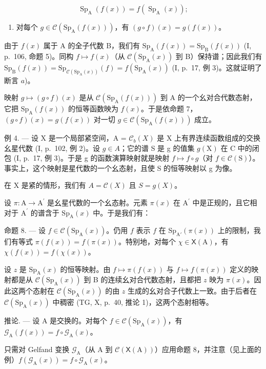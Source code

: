 \[
\operatorname{Sp} _ {\mathrm{A}} (f (x)) = f (\operatorname{Sp} _ {\mathrm{A}} (x));
\]

\begin{enumerate}
\def\labelenumi{\alph{enumi})}
\setcounter{enumi}{1}
\tightlist
\item
  对每个 \(g \in \mathcal{C}(\mathrm{Sp}_{\mathrm{A}}(f(x)))\)，有 \((g \circ f)(x) = g(f(x))\)。
\end{enumerate}

由于 \(f(x)\) 属于 A 的全子代数 B，我们有 \(\mathrm{Sp}_{\mathrm{A}}(f(x)) = \mathrm{Sp}_{\mathrm{B}}(f(x))\) (I, p.~106, 命题 5)。同构 \(f \mapsto f(x)\)（从 \(\mathcal{C}(\mathrm{Sp}_{\mathrm{A}}(x))\) 到 B）保持谱；因此我们有 \(\mathrm{Sp}_{\mathrm{B}}(f(x)) = \mathrm{Sp}_{\mathcal{C}(\mathrm{Sp}_{\mathrm{A}}(x))}(f) = f(\mathrm{Sp}_{\mathrm{A}}(x))\) (I, p.~17, 例 3)。这就证明了断言 \(a\))。

映射 \(g \mapsto (g \circ f)(x)\) 是从 \(\mathcal{C}(\mathrm{Sp}_{\mathrm{A}}(f(x)))\) 到 A 的一个幺对合代数态射，它把 \(\mathrm{Sp}_{\mathrm{A}}(f(x))\) 的恒等函数映为 \(f(x)\)。于是依命题 7，\((g \circ f)(x) = g(f(x))\) 对一切 \(g \in \mathcal{C}(\mathrm{Sp}_{\mathrm{A}}(f(x)))\) 成立。

例 4. --- 设 X 是一个局部紧空间，A = \(\mathcal{C}_{b}(X)\) 是 X 上有界连续函数组成的交换幺星代数 (I, p.~102, 例 2)。设 \(g \in A\)；它的谱 S 是 g 的值集 \(g(\mathrm{X})\) 在 C 中的闭包 (I, p.~17, 例 3)。于是 g 的函数演算映射就是映射 \(f \mapsto f \circ g\)（对 \(f \in \mathcal{C}(\mathrm{S})\)）。事实上，这个映射是星代数的一个幺态射，且使 S 的恒等映射以 g 为像。

在 X 是紧的情形，我们有 \(A = \mathcal{C}(X)\) 且 \(S = g(X)\)。

设 \(\pi\colon\mathrm{A}\to\mathrm{A}^{\prime}\) 是幺星代数的一个幺态射。元素 \(\pi(x)\) 在 \(\mathrm{A}^{\prime}\) 中是正规的，且它相对于 \(\mathrm{A}^{\prime}\) 的谱含于 \(\mathrm{Sp}_{\mathrm{A}}(x)\) 中。于是我们有：

命题 8. --- 设 \(f \in \mathcal{C}(\mathrm{Sp}_{\mathrm{A}}(x))\)。仍用 \(f\) 表示 \(f\) 在 \(\mathrm{Sp}_{\mathrm{A}'}(\pi(x))\) 上的限制，我们有等式 \(\pi(f(x)) = f(\pi(x))\)。特别地，对每个 \(\chi \in \mathsf{X}(\mathrm{A})\)，有 \(\chi(f(x)) = f(\chi(x))\)。

设 \(z\) 是 \(\mathrm{Sp}_{\mathrm{A}}(x)\) 的恒等映射。由 \(f \mapsto \pi(f(x))\) 与 \(f \mapsto f(\pi(x))\) 定义的映射都是从 \(\mathcal{C}(\mathrm{Sp}_{\mathrm{A}}(x))\) 到 B 的连续幺对合代数态射，且都把 \(z\) 映为 \(\pi(x)\)。因此这两个态射在 \(\mathcal{C}(\mathrm{Sp}_{\mathrm{A}}(x))\) 的由 \(z\) 生成的幺对合子代数上一致。由于后者在 \(\mathcal{C}(\mathrm{Sp}_{\mathrm{A}}(x))\) 中稠密 (TG, X, p.~40, 推论 1)，这两个态射相等。

推论. --- 设 A 是交换的。对每个 \(f \in \mathcal{C}(\mathrm{Sp}_{\mathrm{A}}(x))\)，有 \(\mathcal{G}_{\mathrm{A}}(f(x)) = f \circ \mathcal{G}_{\mathrm{A}}(x)\)。

只需对 Gelfand 变换 \(\mathcal{G}_{\mathrm{A}}\)（从 A 到 \(\mathcal{C}(\mathsf{X}(\mathrm{A}))\)）应用命题 8，并注意（见上面的例）\(f(\mathcal{G}_{\mathrm{A}}(x)) = f \circ \mathcal{G}_{\mathrm{A}}(x)\)。

